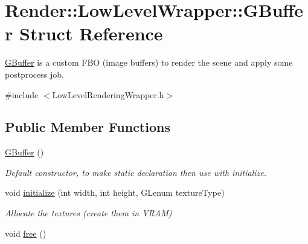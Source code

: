 \hypertarget{struct_render_1_1_low_level_wrapper_1_1_g_buffer}{}\section{Render\+:\+:Low\+Level\+Wrapper\+:\+:G\+Buffer Struct Reference}
\label{struct_render_1_1_low_level_wrapper_1_1_g_buffer}


\hyperlink{struct_render_1_1_low_level_wrapper_1_1_g_buffer}{G\+Buffer} is a custom F\+BO (image buffers) to render the scene and apply some postprocess job.  




{\ttfamily \#include $<$Low\+Level\+Rendering\+Wrapper.\+h$>$}

\subsection*{Public Member Functions}
\begin{DoxyCompactItemize}
\item 
\hyperlink{struct_render_1_1_low_level_wrapper_1_1_g_buffer_ab41a839c5395992fe4f4945707ffe964}{G\+Buffer} ()
\begin{DoxyCompactList}\small\item\em Default constructor, to make static declaration then use with initialize. \end{DoxyCompactList}\item 
void \hyperlink{struct_render_1_1_low_level_wrapper_1_1_g_buffer_ac5100c8b81282427a56b8618d333fb99}{initialize} (int width, int height, G\+Lenum texture\+Type)
\begin{DoxyCompactList}\small\item\em Allocate the textures (create them in V\+R\+AM) \end{DoxyCompactList}\item 
void \hyperlink{struct_render_1_1_low_level_wrapper_1_1_g_buffer_a234a571bceff473b02ad8467bace7499}{free} ()
\end{DoxyCompactItemize}
